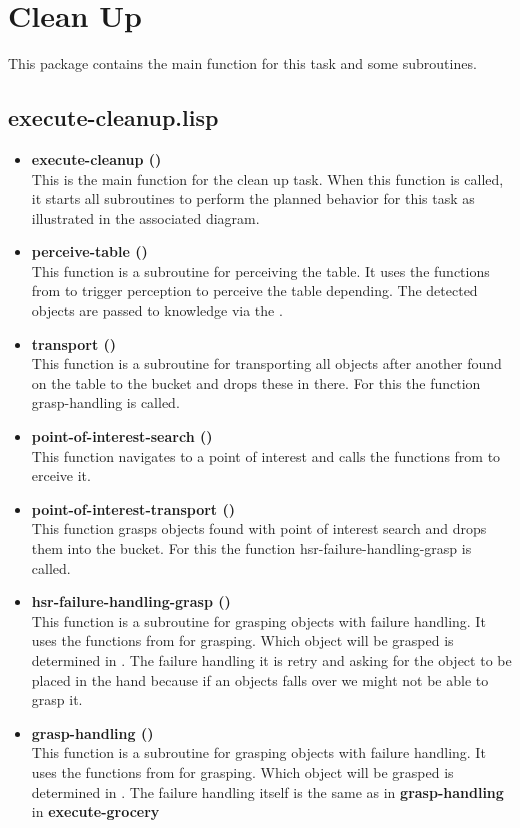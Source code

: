 \documentclass[main.tex]{subfiles}
\begin{document}
	  	\section{Clean Up}
	  	\label{clean}
	  	This package contains the main function for this task and some subroutines.
	  	\subsection{execute-cleanup.lisp}
	  	\begin{itemize}
			\item \textbf{execute-cleanup ()} \\
			This is the main function for the clean up task. When this function is called, it starts all subroutines to perform the planned behavior for this task as illustrated in the associated diagram.
			\item \textbf{perceive-table ()} \\
			This function is a subroutine for perceiving the table. It uses the functions from  to trigger perception to perceive the table depending. The detected objects are passed to knowledge via the .
			\item \textbf{transport ()} \\
            This function is a subroutine for transporting all objects after another found on the table to the bucket and drops these in there. For this the function grasp-handling is called.
			\item \textbf{point-of-interest-search ()} \\
			This function navigates to a point of interest and calls the functions from  to erceive it. 
			\item \textbf{point-of-interest-transport ()} \\
			This function grasps objects found with point of interest search and drops them into the bucket. For this the function hsr-failure-handling-grasp is called.
			\item \textbf{hsr-failure-handling-grasp ()} \\
			This function is a subroutine for grasping objects with failure handling. It uses the functions from  for grasping. Which object will be grasped is determined in . The failure handling it is retry and asking for the object to be placed in the hand because if an objects falls over we might not be  able to grasp it.
			\item \textbf{grasp-handling ()}\\
			This function is a subroutine for grasping objects with failure handling. It uses the functions from  for grasping. Which object will be grasped is determined in . The failure handling itself is the same as in   
\textbf{grasp-handling} in \textbf{execute-grocery}
		\end{itemize}
\end{document}
